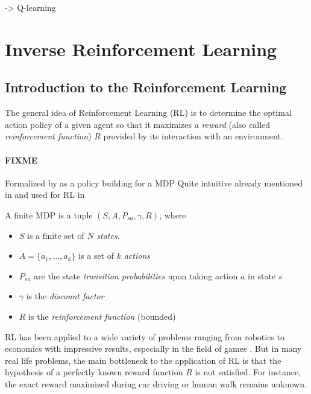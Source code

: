 \documentclass{article}
\begin{document}
\cite{Abbeel04}

\cite{Watkins92} -> Q-learning

\section{Inverse Reinforcement Learning \label{sec:irl}}

\subsection{Introduction to the Reinforcement Learning \label{sec:irl}}

The general idea of Reinforcement Learning (RL) is to determine the optimal action policy of a given agent so that it maximizes a \emph{reward} (also called \emph{reinforcement function}) $R$ provided by its interaction with an environment.

\paragraph{FIXME}
Formalized by \cite{Sutton98} as a policy building for a MDP
Quite intuitive already mentioned in \cite{Bellman57} and used for RL in \cite{Littman94} 

A finite MDP is a tuple $(S,A,P_{sa},\gamma,R)$, where
\begin{itemize}
    \item $S$ is a finite set of $N$ \emph{states}.
    \item $A=\{a_1,...,a_k\}$ is a set of $k$ \emph{actions} 
    \item $P_{sa}$ are the state \emph{transition probabilities} upon taking action $a$ in state $s$
    \item $\gamma$ is the \emph{discount factor}
    \item $R$ is the \emph{reinforcement function} (bounded) 
\end{itemize}

RL has been applied to a wide variety of problems ranging from robotics \cite{Kober13} to economics \cite{Tesauro02} with impressive results, especially in the field of games \cite{Silver16}. But in many real life problems, the main bottleneck to the application of RL is that the hypothesis of a perfectly known reward function $R$ is not satisfied. For instance, the exact reward maximized during car driving \cite{Shalev16} or human walk \cite{Morimoto04} remains unknown.
\end{document}

